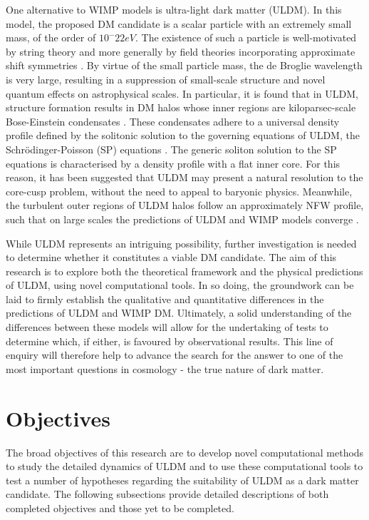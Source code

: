 One alternative to WIMP models is ultra-light dark matter (ULDM). In this model, the proposed DM candidate is a scalar particle with an extremely small mass, of the order of $10^-22 eV$. The existence of such a particle is well-motivated by string theory and more generally by field theories incorporating approximate shift symmetries \cite{Hui:2016ltb}. By virtue of the small particle mass, the de Broglie wavelength is very large, resulting in a suppression of small-scale structure and novel quantum effects on astrophysical scales. In particular, it is found that in ULDM, structure formation results in DM halos whose inner regions are kiloparsec-scale Bose-Einstein condensates \cite{Veltmaat:2018dfz}. These condensates adhere to a universal density profile defined by the solitonic solution to the governing equations of ULDM, the Schr{\"o}dinger-Poisson (SP) equations \cite{Marsh:2015xka}. The generic soliton solution to the SP equations is characterised by a density profile with a flat inner core. For this reason, it has been suggested that ULDM may present a natural resolution to the core-cusp problem, without the need to appeal to baryonic physics. Meanwhile, the turbulent outer regions of ULDM halos follow an approximately NFW profile, such that on large scales the predictions of ULDM and WIMP models converge \cite{Du:2016zcv}.

While ULDM represents an intriguing possibility, further investigation is needed to determine whether it constitutes a viable DM candidate. The aim of this research is to explore both the theoretical framework and the physical predictions of ULDM, using novel computational tools. In so doing, the groundwork can be laid to firmly establish the qualitative and quantitative differences in the predictions of ULDM and WIMP DM. Ultimately, a solid understanding of the differences between these models will allow for the undertaking of tests to determine which, if either, is favoured by observational results. This line of enquiry will therefore help to advance the search for the answer to one of the most important questions in cosmology - the true nature of dark matter. 


\section{Objectives}

The broad objectives of this research are to develop novel computational methods to study the detailed dynamics of ULDM and to use these computational tools to test a number of hypotheses regarding the suitability of ULDM as a dark matter candidate. The following subsections provide detailed descriptions of both completed objectives and those yet to be completed. 

